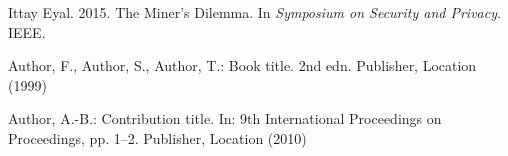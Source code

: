 \documentclass[a4paper, 11pt]{article}
\begin{document}
\begin{CJK*}{UTF8}{gbsn}
\begin{thebibliography}{8}
    Ittay Eyal. 2015. The Miner’s Dilemma. In \textit{Symposium on Security and Privacy}.
IEEE.


    Author, F., Author, S., Author, T.: Book title. 2nd edn. Publisher,
    Location (1999)
    
    Author, A.-B.: Contribution title. In: 9th International Proceedings
    on Proceedings, pp. 1--2. Publisher, Location (2010)

    
    
    \end{thebibliography}
    
    \end{CJK*}
    
    
\end{document}
